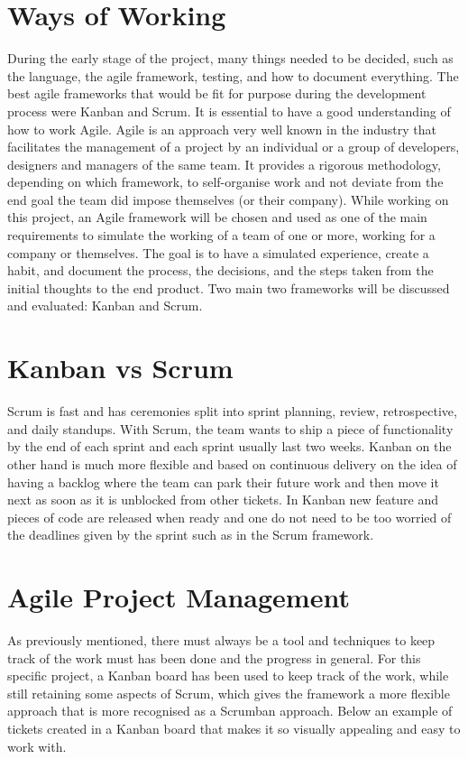 \section{Ways of Working}
\label{s:Ways-of-Working}
During the early stage of the project, many things needed to be decided, such as
the language, the agile framework, testing, and how to document everything. The
best agile frameworks that would be fit for purpose during the development
process were Kanban and Scrum. It is essential to have a good understanding of
how to work Agile. Agile is an approach very well known in the industry that
facilitates the management of a project by an individual or a group of
developers, designers and managers of the same team. It provides a rigorous
methodology, depending on which framework, to self-organise work and not deviate
from the end goal the team did impose themselves (or their company).
While working on this project, an Agile framework will be chosen and used as one
of the main requirements to simulate the working of a team of one or more,
working for a company or themselves. The goal is to have a simulated experience,
create a habit, and document the process, the decisions, and the steps taken
from the initial thoughts to the end product. Two main two frameworks will be
discussed and evaluated: Kanban and Scrum.

\section{Kanban vs Scrum}
\label{s:Kanban-vs-Scrum}
Scrum is fast and has ceremonies split into sprint planning, review,
retrospective, and daily standups. With Scrum, the team wants to ship a piece of
functionality by the end of each sprint and each sprint usually last two weeks.
Kanban on the other hand is much more flexible and based on continuous delivery
on the idea of having a backlog where the team can park their future work and
then move it next as soon as it is unblocked from other tickets. In Kanban new
feature and pieces of code are released when ready and one do not need to be too
worried of the deadlines given by the sprint such as in the Scrum framework.

\section{Agile Project Management}
\label{s:Agile-Project-Management}
As previously mentioned, there must always be a tool and techniques to keep
track of the work must has been done and the progress in general. For this
specific project, a Kanban board has been used to keep track of the work, while
still retaining some aspects of Scrum, which gives the framework a more flexible
approach that is more recognised as a Scrumban approach. Below an example of
tickets created in a Kanban board that makes it so visually appealing and easy
to work with.

